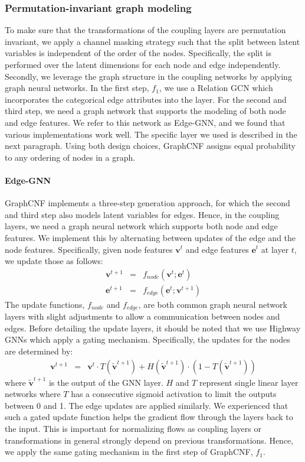 \subsubsection{Permutation-invariant graph modeling}
To make sure that the transformations of the coupling layers are permutation invariant,
we apply a channel masking strategy \cite{RealNVP} such that the split between latent variables is independent of the order of the nodes.
Specifically, the split is performed over the latent dimensions for each node and edge independently.
Secondly, we leverage the graph structure in the coupling networks by applying graph neural networks. 
In the first step, $f_1$, we use a Relation GCN \cite{RGCN} which incorporates the categorical edge attributes into the layer.
For the second and third step, we need a graph network that supports the modeling of both node and edge features.
We refer to this network as Edge-GNN, and we found that various implementations work well.
The specific layer we used is described in the next paragraph.
Using both design choices, GraphCNF assigns equal probability to any ordering of nodes in a graph.

\paragraph{Edge-GNN} GraphCNF implements a three-step generation approach, for which the second and third step also models latent variables for edges. Hence, in the coupling layers, we need a graph neural network which supports both node and edge features. We implement this by alternating between updates of the edge and the node features. Specifically, given node features $\bm{v}^{t}$ and edge features $\bm{e}^{t}$ at layer $t$, we update those as follows:
\begin{eqnarray}
    \bm{v}^{t+1} & = & f_{node}(\bm{v}^{t}; \bm{e}^{t})\\
    \bm{e}^{t+1} & = & f_{edge}(\bm{e}^{t}; \bm{v}^{t+1})
\end{eqnarray}
The update functions, $f_{node}$ and $f_{edge}$, are both common graph neural network layers with slight adjustments to allow a communication between nodes and edges. 
Before detailing the update layers, it should be noted that we use Highway GNNs \cite{HighwayGNN} which apply a gating mechanism. 
Specifically, the updates for the nodes are determined by:
\begin{eqnarray}
    \bm{v}^{t+1} & = & \bm{v}^{t} \cdot T\left(\tilde{\bm{v}}^{t+1}\right) + H\left(\tilde{\bm{v}}^{t+1}\right) \cdot \left(1 - T\left(\tilde{\bm{v}}^{t+1}\right)\right)
\end{eqnarray}
where $\tilde{\bm{v}}^{t+1}$ is the output of the GNN layer. 
$H$ and $T$ represent single linear layer networks where $T$ has a consecutive sigmoid activation to limit the outputs between 0 and 1. 
The edge updates are applied similarly. 
We experienced that such a gated update function helps the gradient flow through the layers back to the input. 
This is important for normalizing flows as coupling layers or transformations in general strongly depend on previous transformations. 
Hence, we apply the same gating mechanism in the first step of GraphCNF, $f_1$.

